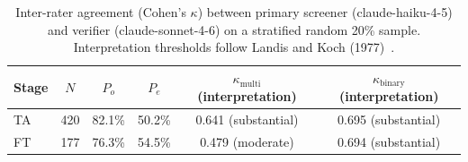 \begin{table}[htbp]
\centering
\caption{Inter-rater agreement (Cohen's $\kappa$) between primary screener (claude-haiku-4-5) and verifier (claude-sonnet-4-6) on a stratified random 20\% sample. Interpretation thresholds follow Landis and Koch (1977)~\cite{landiskoch1977}.}
\label{tab:kappa-results}
\begin{tabular}{lccccc}
\toprule
Stage & $N$ & $P_o$ & $P_e$ & $\kappa_{\text{multi}}$ (interpretation) & $\kappa_{\text{binary}}$ (interpretation) \\
\midrule
TA & 420 & 82.1\% & 50.2\% & 0.641 (substantial) & 0.695 (substantial) \\
FT & 177 & 76.3\% & 54.5\% & 0.479 (moderate) & 0.694 (substantial) \\
\bottomrule
\end{tabular}
\end{table}